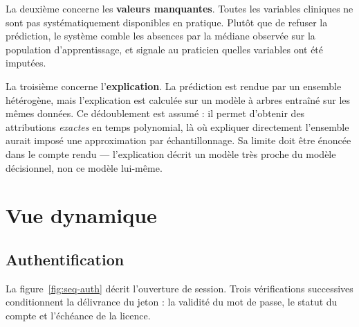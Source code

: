 La deuxième concerne les \textbf{valeurs manquantes}. Toutes les variables cliniques
ne sont pas systématiquement disponibles en pratique. Plutôt que de refuser la
prédiction, le système comble les absences par la médiane observée sur la population
d'apprentissage, et signale au praticien quelles variables ont été imputées.

La troisième concerne l'\textbf{explication}. La prédiction est rendue par un ensemble
hétérogène, mais l'explication est calculée sur un modèle à arbres entraîné sur les
mêmes données. Ce dédoublement est assumé : il permet d'obtenir des attributions
\emph{exactes} en temps polynomial, là où expliquer directement l'ensemble aurait
imposé une approximation par échantillonnage. Sa limite doit être énoncée dans le
compte rendu — l'explication décrit un modèle très proche du modèle décisionnel, non
ce modèle lui-même.

\section{Vue dynamique}

\subsection{Authentification}

La figure~\ref{fig:seq-auth} décrit l'ouverture de session. Trois vérifications
successives conditionnent la délivrance du jeton : la validité du mot de passe, le
statut du compte et l'échéance de la licence.

